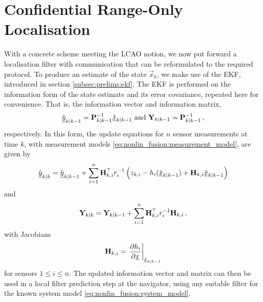 \section{Confidential Range-Only Localisation}\label{sec:nonlin_fusion:conf_range_only_localisation}
With a concrete scheme meeting the LCAO notion, we now put forward a localisation filter with communication that can be reformulated to the required protocol. To produce an estimate of the state $\vec{x}_k$, we make use of the EKF, introduced in section \ref{subsec:prelims:ekf}. The EKF is performed on the information form of the state estimate and its error covariance, repeated here for convenience. That is, the information vector and information matrix,
\begin{equation}\label{eq:nonlin_fusion:eif_info_vec_info_mat}
    \hat{{\underline{y}}}_{k|k-1} = {{\mathbf{P}}}_{k|k-1}^{-1}\hat{{\underline{x}}}_{k|k-1} \text{ and } {\ensuremath{{\mathbf{Y}}}}_{k|k-1} = {{\mathbf{P}}}_{k|k-1}^{-1}\,,
\end{equation}
respectively. In this form, the update equations for $n$ sensor measurements at time $k$, with measurement models \eqref{eq:nonlin_fusion:measurement_model}, are given by
\begin{equation}\label{eq:nonlin_fusion:eif_info_vec_update}
        \hat{{\underline{y}}}_{k|k} = \hat{{\underline{y}}}_{k|k-1} +  \sum^n_{i=1}{{\mathbf{H}}}^\top_{k,i} r^{-1}_i \left(z_{k,i} - h_i(\hat{{\underline{x}}}_{k|k-1}) + {{\mathbf{H}}}_{k,i}\hat{{\underline{x}}}_{k|k-1}\right)
\end{equation}
and
\begin{equation}\label{eq:nonlin_fusion:eif_info_mat_update}
    {\ensuremath{{\mathbf{Y}}}}_{k|k} = {{\mathbf{Y}}}_{k|k-1} + \sum^n_{i=1}{{\mathbf{H}}}^\top_{k,i} r^{-1}_i {{\mathbf{H}}}_{k,i}\,,
\end{equation}
with Jacobians
\begin{equation}\label{eq:nonlin_fusion:measurement_jacobian}
    {\ensuremath{{\mathbf{H}}}}_{k,i} = \left.\frac{\partial h_i}{\partial {\underline{x}}}\right|_{\hat{{\underline{x}}}_{k|k-1}}
\end{equation}
for sensors $1\leq i\leq n$. The updated information vector and matrix can then be used in a local filter prediction step at the navigator, using any suitable filter for the known system model \eqref{eq:nonlin_fusion:system_model}.

